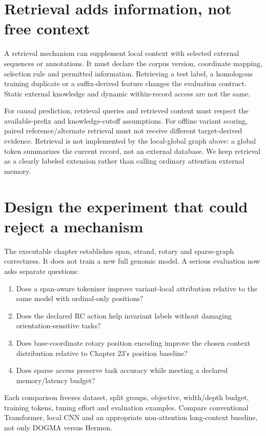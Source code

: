 \section{Retrieval adds information, not free context}
A retrieval mechanism can supplement local context with selected external
sequences or annotations. It must declare the corpus version, coordinate mapping,
selection rule and permitted information. Retrieving a test label, a homologous
training duplicate or a suffix-derived feature changes the evaluation contract.
Static external knowledge and dynamic within-record access are not the same.

For causal prediction, retrieval queries and retrieved content must respect the
available-prefix and knowledge-cutoff assumptions. For offline variant scoring,
paired reference/alternate retrieval must not receive different target-derived
evidence. Retrieval is not implemented by the local-global graph above: a global
token summarizes the current record, not an external database. We keep retrieval
as a clearly labeled extension rather than calling ordinary attention external
memory.

\section{Design the experiment that could reject a mechanism}
The executable chapter establishes span, strand, rotary and sparse-graph
correctness. It does not train a new full genomic model.
A serious evaluation now asks separate questions:
\begin{enumerate}
\item Does a span-aware tokenizer improve variant-local attribution relative to
the same model with ordinal-only positions?
\item Does the declared RC action help invariant labels without damaging
orientation-sensitive tasks?
\item Does base-coordinate rotary position encoding improve the chosen context
distribution relative to Chapter 23's position baseline?
\item Does sparse access preserve task accuracy while meeting a declared
memory/latency budget?
\end{enumerate}
Each comparison freezes dataset, split groups, objective, width/depth budget,
training tokens, tuning effort and evaluation examples. Compare conventional
Transformer, local CNN and an appropriate non-attention long-context baseline,
not only DOGMA versus Hermon.

